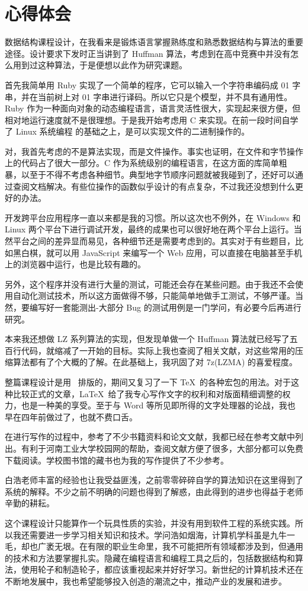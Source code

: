 \newpage
\section*{心得体会}

数据结构课程设计，在我看来是锻炼语言掌握熟练度和熟悉数据结构与算法的重要途径。设计要求下发时正当讲到了 Huffman 算法，考虑到在高中竞赛中并没有怎么用到过这种算法，于是便想以此作为研究课题。

首先我简单用 Ruby 实现了一个简单的程序，它可以输入一个字符串编码成 01 字串，并在当前树上对 01 字串进行译码。所以它只是个模型，并不具有通用性。Ruby 作为一种面向对象的动态编程语言，语言灵活性很大，实现起来很方便，但相对地运行速度就不是很理想。于是我开始考虑用 C 来实现。在前一段时间自学了 Linux 系统编程 \cite{linuxmnl} 的基础之上，是可以实现文件的二进制操作的。

对，我首先考虑的不是算法实现，而是文件操作。事实也证明，在文件和字节操作上的代码占了很大一部分。C 作为系统级别的编程语言，在这方面的库简单粗暴，以至于不得不考虑各种细节。典型地字节顺序问题就被我碰到了，还好可以通过查阅文档解决。有些位操作的函数似乎设计的有点复杂，不过我还没想到什么更好的办法。

开发跨平台应用程序一直以来都是我的习惯。所以这次也不例外，在 Windows 和 Linux 两个平台下进行调试开发，最终的成果也可以很好地在两个平台上运行。当然平台之间的差异显而易见，各种细节还是需要考虑到的。其实对于有些题目，比如黑白棋，就可以用 JavaScript 来编写一个 Web 应用，可以直接在电脑甚至手机上的浏览器中运行，也是比较有趣的。

另外，这个程序并没有进行大量的测试，可能还会存在某些问题。由于我还不会使用自动化测试技术，所以这方面做得不够，只能简单地做手工测试，不够严谨。当然，要编写好一套能测出-大部分 Bug 的测试用例是一门学问，有必要今后再进行研究。

本来我还想做 LZ 系列算法的实现，但发现单做一个 Huffman 算法就已经写了五百行代码，就缩减了一开始的目标。实际上我也查阅了相关文献，对这些常用的压缩算法都有了个大概的了解。在此基础上，我巩固了对 7z(LZMA) 的喜爱程度。

整篇课程设计是用 \LaTeXe\ 排版的，期间又复习了一下 \TeX\ 的各种宏包的用法。对于这种比较正式的文章，\LaTeX\ 给了我专心写作文字的权利和对版面精细调整的权力，也是一种美的享受。至于与 Word 等所见即所得的文字处理器的论战，我也早在四年前做过了，也就不费口舌。

在进行写作的过程中，参考了不少书籍资料和论文文献，我都已经在参考文献中列出。有利于河南工业大学校园网的帮助，查阅文献方便了很多，大部分都可以免费下载阅读。学校图书馆的藏书也为我的写作提供了不少参考。

白浩老师丰富的经验也让我受益匪浅，之前零零碎碎自学的算法知识在这里得到了系统的解释。不少之前不明确的问题也得到了解惑，由此得到的进步也得益于老师辛勤的耕耘。

这个课程设计只能算作一个玩具性质的实验，并没有用到软件工程的系统实践。所以我还需要进一步学习相关知识和技术。学问浩如烟海，计算机学科虽是九牛一毛，却也广袤无垠。在有限的职业生命里，我不可能把所有领域都涉及到，但通用的技术和方法要掌握扎实。隐藏在编程语言和编程工具之后的，包括数据结构和算法，使用轮子和制造轮子，都应该重视起来并好好学习。新世纪的计算机技术还在不断地发展中，我也希望能够投入创造的潮流之中，推动产业的发展和进步。
